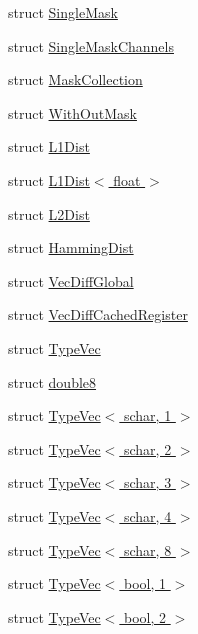 \begin{DoxyCompactItemize}
\item 
struct \hyperlink{structcv_1_1gpu_1_1device_1_1SingleMask}{Single\-Mask}
\item 
struct \hyperlink{structcv_1_1gpu_1_1device_1_1SingleMaskChannels}{Single\-Mask\-Channels}
\item 
struct \hyperlink{structcv_1_1gpu_1_1device_1_1MaskCollection}{Mask\-Collection}
\item 
struct \hyperlink{structcv_1_1gpu_1_1device_1_1WithOutMask}{With\-Out\-Mask}
\item 
struct \hyperlink{structcv_1_1gpu_1_1device_1_1L1Dist}{L1\-Dist}
\item 
struct \hyperlink{structcv_1_1gpu_1_1device_1_1L1Dist_3_01float_01_4}{L1\-Dist$<$ float $>$}
\item 
struct \hyperlink{structcv_1_1gpu_1_1device_1_1L2Dist}{L2\-Dist}
\item 
struct \hyperlink{structcv_1_1gpu_1_1device_1_1HammingDist}{Hamming\-Dist}
\item 
struct \hyperlink{structcv_1_1gpu_1_1device_1_1VecDiffGlobal}{Vec\-Diff\-Global}
\item 
struct \hyperlink{structcv_1_1gpu_1_1device_1_1VecDiffCachedRegister}{Vec\-Diff\-Cached\-Register}
\item 
struct \hyperlink{structcv_1_1gpu_1_1device_1_1TypeVec}{Type\-Vec}
\item 
struct \hyperlink{structcv_1_1gpu_1_1device_1_1double8}{double8}
\item 
struct \hyperlink{structcv_1_1gpu_1_1device_1_1TypeVec_3_01schar_00_011_01_4}{Type\-Vec$<$ schar, 1 $>$}
\item 
struct \hyperlink{structcv_1_1gpu_1_1device_1_1TypeVec_3_01schar_00_012_01_4}{Type\-Vec$<$ schar, 2 $>$}
\item 
struct \hyperlink{structcv_1_1gpu_1_1device_1_1TypeVec_3_01schar_00_013_01_4}{Type\-Vec$<$ schar, 3 $>$}
\item 
struct \hyperlink{structcv_1_1gpu_1_1device_1_1TypeVec_3_01schar_00_014_01_4}{Type\-Vec$<$ schar, 4 $>$}
\item 
struct \hyperlink{structcv_1_1gpu_1_1device_1_1TypeVec_3_01schar_00_018_01_4}{Type\-Vec$<$ schar, 8 $>$}
\item 
struct \hyperlink{structcv_1_1gpu_1_1device_1_1TypeVec_3_01bool_00_011_01_4}{Type\-Vec$<$ bool, 1 $>$}
\item 
struct \hyperlink{structcv_1_1gpu_1_1device_1_1TypeVec_3_01bool_00_012_01_4}{Type\-Vec$<$ bool, 2 $>$}
\item 

\end{DoxyCompactItemize}
